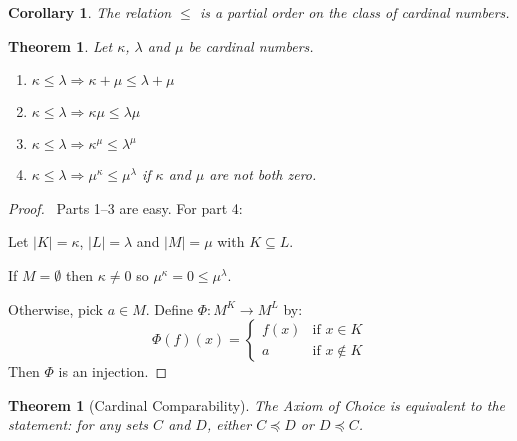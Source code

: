 \documentclass{article}
\let\qed\relax
\newtheorem{theorem}[axiom]{Theorem}
\newtheorem{corollary}{Corollary}[axiom]
\theoremstyle{definition}
\begin{document}
    \begin{corollary}
        The relation $\leq$ is a partial order on the class of cardinal numbers.
    \end{corollary}

    \begin{theorem}
        Let $\kappa$, $\lambda$ and $\mu$ be cardinal numbers.
        \begin{enumerate}
            \item $\kappa \leq \lambda \Rightarrow \kappa + \mu \leq \lambda + \mu$
            \item $\kappa \leq \lambda \Rightarrow \kappa \mu \leq \lambda \mu$
            \item $\kappa \leq \lambda \Rightarrow \kappa^\mu \leq \lambda^\mu$
            \item $\kappa \leq \lambda \Rightarrow \mu^\kappa \leq \mu^\lambda$ if $\kappa$ and $\mu$
            are not both zero.
        \end{enumerate}
    \end{theorem}

    \begin{proof}
        \pf\ Parts 1--3 are easy. For part 4:
        
        Let $|K| = \kappa$, $|L| = \lambda$ and $|M| = \mu$ with $K \subseteq L$.

        If $M = \emptyset$ then $\kappa \neq 0$ so $\mu^\kappa = 0 \leq \mu^\lambda$.

        Otherwise, pick $a \in M$. Define $\Phi : M^K \rightarrow M^L$ by:
        \[ \Phi(f)(x) = \begin{cases}
            f(x) & \text{if } x \in K \\
            a & \text{if } x \notin K
        \end{cases} \]
        Then $\Phi$ is an injection. \qed
    \end{proof}

    \begin{theorem}[Cardinal Comparability]
        The Axiom of Choice is equivalent to the statement: for any sets $C$ and $D$,
        either $C \preccurlyeq D$ or $D \preccurlyeq C$.
    \end{theorem}
\end{document}

